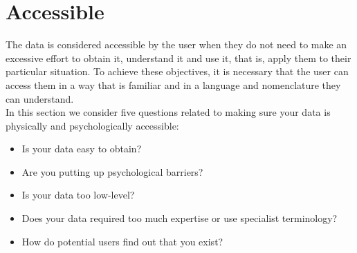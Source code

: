 \section{Accessible}

The data is considered accessible by the user when they do not need to make an excessive effort
to obtain it, understand it and use it, that is, apply them to their particular situation. To achieve these objectives,
it is necessary that the user can access them in a way that is familiar and in a language and nomenclature
they can understand.\\ 

In this section we consider five questions related to making sure your data is physically and psychologically accessible:

\begin{itemize}
    \item Is your data easy to obtain?
    \item Are you putting up psychological barriers?
    \item Is your data too low-level?
    \item Does your data required too much expertise or use specialist terminology?
    \item How do potential users find out that you exist?
\end{itemize}






